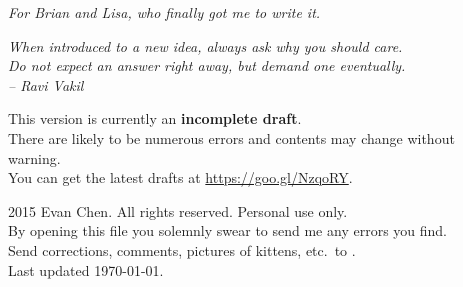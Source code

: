 \begin{titlepage}
	\vspace*{8cm}
	\begin{center}
		\itshape
		\noindent
		For Brian and Lisa, who finally got me to write it.
	\end{center}
\end{titlepage}

\begin{titlepage}
	\vspace*{8cm}
	\begin{flushright}
		\itshape\large
		When introduced to a new idea, always ask why you should care. \\[0.2cm]
		Do not expect an answer right away, but demand one eventually. \\[0.8cm]
		-- Ravi Vakil \cite{ref:vakil}
	\end{flushright}

	
	\vfill

	{
	\footnotesize
	\noindent This version is currently an \textbf{incomplete draft}. \\
	There are likely to be numerous errors and contents may change without warning. \\
	You can get the latest drafts at \url{https://goo.gl/NzqoRY}.
	}
	
	\vspace*{1cm}

	{
	\large
	\noindent {\copyright} 2015 Evan Chen.  All rights reserved. Personal use only. \\[0.8cm]
	By opening this file you solemnly swear to send me any errors you find. \\ [0.4cm]
	Send corrections, comments, pictures of kittens,
	etc.\ to . \\[0.8cm]
	Last updated \today.
	\vspace*{1cm}
	}

\end{titlepage}
